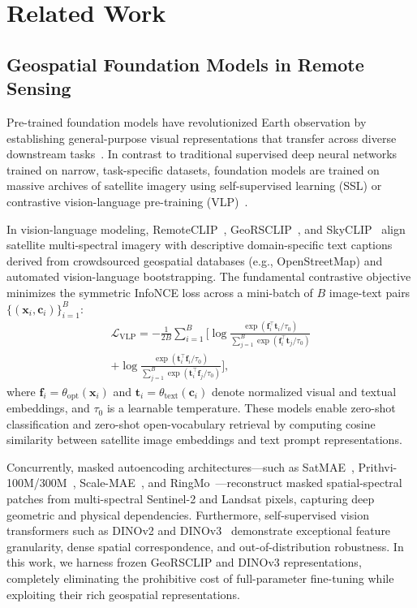 \section{Related Work}
\label{sec:related}

\subsection{Geospatial Foundation Models in Remote Sensing}
Pre-trained foundation models have revolutionized Earth observation by establishing general-purpose visual representations that transfer across diverse downstream tasks~\cite{zhang2024rs5m,simeoni2025dinov3,congo2023satmae}. In contrast to traditional supervised deep neural networks trained on narrow, task-specific datasets, foundation models are trained on massive archives of satellite imagery using self-supervised learning (SSL) or contrastive vision-language pre-training (VLP)~\cite{radford2021learning}.

In vision-language modeling, RemoteCLIP~\cite{wang2023remoteclip}, GeoRSCLIP~\cite{zhang2024rs5m}, and SkyCLIP~\cite{mai2023skyclip} align satellite multi-spectral imagery with descriptive domain-specific text captions derived from crowdsourced geospatial databases (e.g., OpenStreetMap) and automated vision-language bootstrapping. The fundamental contrastive objective minimizes the symmetric InfoNCE loss across a mini-batch of $B$ image-text pairs $\{(\bm{x}_i, \bm{c}_i)\}_{i=1}^B$:
\begin{equation}
\begin{split}
    \mathcal{L}_{\text{VLP}} = -\frac{1}{2B} \sum_{i=1}^B \Bigg[ \log \frac{\exp(\bm{f}_i^\top \bm{t}_i / \tau_0)}{\sum_{j=1}^B \exp(\bm{f}_i^\top \bm{t}_j / \tau_0)} \\
    + \log \frac{\exp(\bm{t}_i^\top \bm{f}_i / \tau_0)}{\sum_{j=1}^B \exp(\bm{t}_i^\top \bm{f}_j / \tau_0)} \Bigg],
\end{split}
\end{equation}
where $\bm{f}_i = \theta_{\text{opt}}(\bm{x}_i)$ and $\bm{t}_i = \theta_{\text{text}}(\bm{c}_i)$ denote normalized visual and textual embeddings, and $\tau_0$ is a learnable temperature. These models enable zero-shot classification and zero-shot open-vocabulary retrieval by computing cosine similarity between satellite image embeddings and text prompt representations.

Concurrently, masked autoencoding architectures---such as SatMAE~\cite{congo2023satmae}, Prithvi-100M/300M~\cite{jakubik2023prithvi}, Scale-MAE~\cite{reed2023scalemae}, and RingMo~\cite{qi2020mlrsnet}---reconstruct masked spatial-spectral patches from multi-spectral Sentinel-2 and Landsat pixels, capturing deep geometric and physical dependencies. Furthermore, self-supervised vision transformers such as DINOv2 and DINOv3~\cite{simeoni2025dinov3} demonstrate exceptional feature granularity, dense spatial correspondence, and out-of-distribution robustness. In this work, we harness frozen GeoRSCLIP and DINOv3 representations, completely eliminating the prohibitive cost of full-parameter fine-tuning while exploiting their rich geospatial representations.

